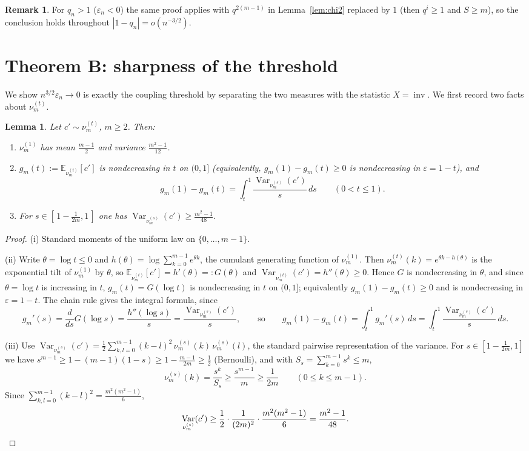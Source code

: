 \documentclass[12pt]{article}
\newtheorem{lemma}{Lemma}
\theoremstyle{definition}
\newtheorem{remark}{Remark}
\DeclareMathOperator{\inv}{inv}
\DeclareMathOperator{\Var}{Var}
\newcommand{\E}{\mathbb{E}}
\newcommand{\eps}{\varepsilon}
\begin{document}
\begin{remark}
For $q_n>1$ ($\eps_n<0$) the same proof applies with $q^{2(m-1)}$ in
Lemma~\ref{lem:chi2} replaced by $1$ (then $q^i\ge1$ and $S\ge m$), so the conclusion
holds throughout $|1-q_n|=o(n^{-3/2})$.
\end{remark}

\section{Theorem B: sharpness of the threshold}\label{sec:B}

We show $n^{3/2}\eps_n\to0$ is exactly the coupling threshold by separating the two
measures with the statistic $X=\inv$. We first record two facts about
$\nu^{(t)}_m$.

\begin{lemma}\label{lem:moments}
Let $c'\sim\nu^{(t)}_m$, $m\ge2$. Then:
\begin{enumerate}
\item[(i)] $\nu^{(1)}_m$ has mean $\tfrac{m-1}{2}$ and variance $\tfrac{m^2-1}{12}$.
\item[(ii)] $g_m(t):=\E_{\nu^{(t)}_m}[c']$ is nondecreasing in $t$ on $(0,1]$
(equivalently, $g_m(1)-g_m(t)\ge0$ is nondecreasing in $\eps=1-t$), and
\[
g_m(1)-g_m(t)=\int_t^1 \frac{\Var_{\nu^{(s)}_m}(c')}{s}\,ds\qquad(0<t\le1).
\]
\item[(iii)] For $s\in[\,1-\tfrac1{2m},1\,]$ one has $\Var_{\nu^{(s)}_m}(c')\ge\tfrac{m^2-1}{48}$.
\end{enumerate}
\end{lemma}

\begin{proof}
(i) Standard moments of the uniform law on $\{0,\dots,m-1\}$.

(ii) Write $\theta=\log t\le0$ and $h(\theta)=\log\sum_{k=0}^{m-1}e^{\theta k}$, the
cumulant generating function of $\nu^{(1)}_m$. Then $\nu^{(t)}_m(k)=e^{\theta k-h(\theta)}$
is the exponential tilt of $\nu^{(1)}_m$ by $\theta$, so
$\E_{\nu^{(t)}_m}[c']=h'(\theta)=:G(\theta)$ and
$\Var_{\nu^{(t)}_m}(c')=h''(\theta)\ge0$. Hence $G$ is nondecreasing in $\theta$, and
since $\theta=\log t$ is increasing in $t$, $g_m(t)=G(\log t)$ is nondecreasing in $t$
on $(0,1]$; equivalently $g_m(1)-g_m(t)\ge0$ and is nondecreasing in $\eps=1-t$. The
chain rule gives the integral formula, since
\[
g_m'(s)=\frac{d}{ds}G(\log s)=\frac{h''(\log s)}{s}=\frac{\Var_{\nu^{(s)}_m}(c')}{s},
\qquad\text{so}\qquad
g_m(1)-g_m(t)=\int_t^1 g_m'(s)\,ds=\int_t^1\frac{\Var_{\nu^{(s)}_m}(c')}{s}\,ds.
\]

(iii) Use $\Var_{\nu^{(s)}_m}(c')=\tfrac12\sum_{k,l=0}^{m-1}(k-l)^2\,\nu^{(s)}_m(k)\,\nu^{(s)}_m(l)$,
the standard pairwise representation of the variance. For $s\in[1-\tfrac1{2m},1]$ we
have $s^{m-1}\ge 1-(m-1)(1-s)\ge 1-\tfrac{m-1}{2m}\ge\tfrac12$ (Bernoulli), and with
$S_s=\sum_{k=0}^{m-1}s^k\le m$,
\[
\nu^{(s)}_m(k)=\frac{s^k}{S_s}\ge\frac{s^{m-1}}{m}\ge\frac{1}{2m}\qquad(0\le k\le m-1).
\]
Since $\sum_{k,l=0}^{m-1}(k-l)^2=\tfrac{m^2(m^2-1)}{6}$,
\[
\Var_{\nu^{(s)}_m}(c')\ge\frac12\cdot\frac{1}{(2m)^2}\cdot\frac{m^2(m^2-1)}{6}
=\frac{m^2-1}{48}.\qedhere
\]
\end{proof}
\end{document}
